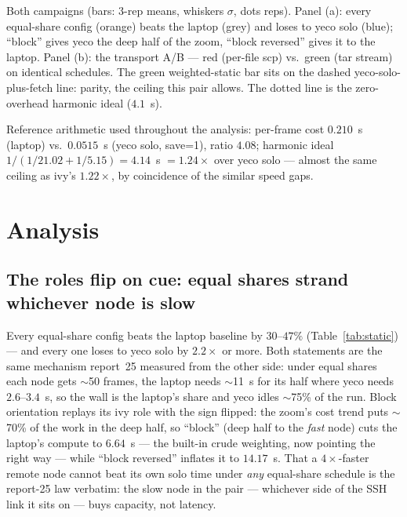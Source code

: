 \documentclass[
	english,
	letterpaper, oneside
]{article}
\begin{document}
            {Both campaigns (bars: 3-rep means, whiskers $\sigma$, dots
             reps). Panel (a): every equal-share config (orange) beats the
             laptop (grey) and loses to yeco solo (blue); ``block'' gives
             yeco the deep half of the zoom, ``block reversed'' gives it
             to the laptop. Panel (b): the transport A/B --- red (per-file
             scp) vs.\ green (tar stream) on identical schedules. The
             green weighted-static bar sits on the dashed
             yeco-solo-plus-fetch line: parity, the ceiling this pair
             allows. The dotted line is the zero-overhead harmonic ideal
             ($4.1$~s).\label{fig:yeco}}

Reference arithmetic used throughout the analysis: per-frame cost
$0.210$~s (laptop) vs.\ $0.0515$~s (yeco solo, save=1), ratio $4.08$;
harmonic ideal $1/(1/21.02 + 1/5.15) = 4.14$~s $= 1.24\times$ over yeco
solo --- almost the same ceiling as ivy's $1.22\times$, by coincidence of
the similar speed gaps.

\section{Analysis}
\label{sec:analysis}

\subsection{The roles flip on cue: equal shares strand whichever node is slow}
\label{sec:flip}

Every equal-share config beats the laptop baseline by $30$--$47\%$
(Table~\ref{tab:static}) --- and every one loses to yeco solo by
$2.2\times$ or more. Both statements are the same mechanism report~25
measured from the other side: under equal shares each node gets
$\sim$50 frames, the laptop needs $\sim$11~s for its half where yeco
needs $2.6$--$3.4$~s, so the wall is the laptop's share and yeco idles
$\sim$75\% of the run. Block orientation replays its ivy role with the
sign flipped: the zoom's cost trend puts $\sim$70\% of the work in the
deep half, so ``block'' (deep half to the \emph{fast} node) cuts the
laptop's compute to $6.64$~s --- the built-in crude weighting, now
pointing the right way --- while ``block reversed'' inflates it to
$14.17$~s. That a $4\times$-faster remote node cannot beat its own solo
time under \emph{any} equal-share schedule is the report-25 law
verbatim: the slow node in the pair --- whichever side of the SSH link it
sits on --- buys capacity, not latency.
\end{document}

